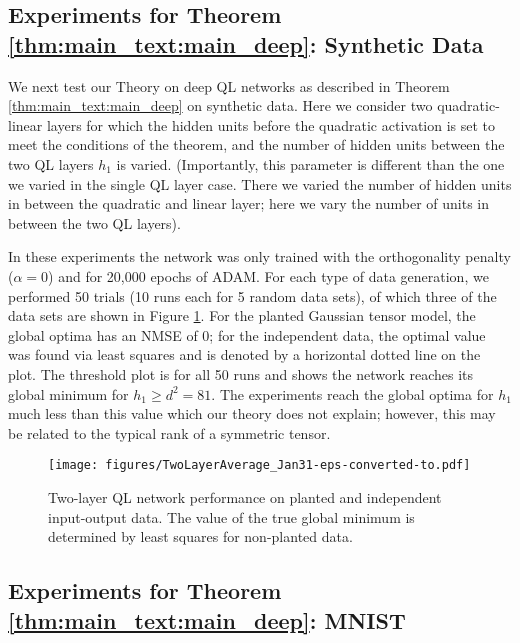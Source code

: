 \documentclass[11pt]{article}
\theoremstyle{plain}
\theoremstyle{plain}
\numberwithin{equation}{section}
\numberwithin{lemma}{section}
\numberwithin{theorem}{section}
\numberwithin{corollary}{section}
\numberwithin{observation}{section}
\numberwithin{definition}{section}
\numberwithin{example}{section}
\begin{document}
\subsection{Experiments for Theorem \ref{thm:main_text:main_deep}: Synthetic Data}

We next test our Theory on deep QL networks as described in Theorem \ref{thm:main_text:main_deep} on synthetic data. Here we consider two quadratic-linear layers for which the hidden units before the quadratic activation is set to meet the conditions of the theorem, and the number of hidden units between the two QL layers $h_1$ is varied.  (Importantly, this parameter is different than the one we varied in the single QL layer case.  There we varied the number of hidden units in between the quadratic and linear layer; here we vary the number of units in between the two QL layers).



In these experiments the network was only trained with the orthogonality penalty ($\alpha = 0$) and for 20,000 epochs of ADAM. For each type of data generation, we performed 50 trials (10 runs each for 5 random data sets), of which three of the data sets are shown in Figure \ref{fig:twoLayerExp}.  For the planted Gaussian tensor model, the global optima has an NMSE of 0; for the independent data, the optimal value was found via least squares and is denoted by a horizontal dotted line on the plot.  The threshold plot is for all 50 runs and shows the network reaches its global minimum for $h_1 \geq d^2 = 81$.  The experiments reach the global optima for $h_1$ much less than this value which our theory does not explain; however, this may be related to the typical rank of a symmetric tensor.


\begin{figure}
\begin{center}
\noindent
\texttt{[image: figures/TwoLayerAverage\_Jan31-eps-converted-to.pdf]}
\caption{Two-layer QL network performance on planted and independent input-output data. The value of the true global minimum is determined by least squares for non-planted data.}
\label{fig:twoLayerExp}
\end{center}
\end{figure}




\subsection{Experiments for Theorem \ref{thm:main_text:main_deep}: MNIST} 
\end{document}
